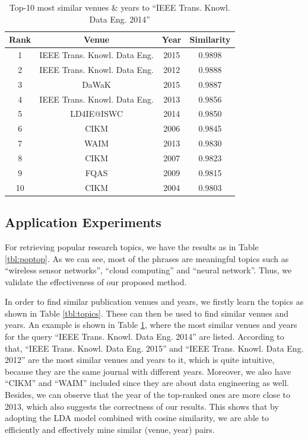 \documentclass{sig-alternate-05-2015}
\begin{document}
\begin{table}
\centering
\caption{Top-10 most similar venues \& years to ``IEEE Trans. Knowl. Data Eng. 2014''} \label{tbl:simvy}
\begin{tabular}{cccc} \hline
Rank & Venue & Year & Similarity\\ 
\hline
1 & IEEE Trans. Knowl. Data Eng. & 2015 & 0.9898 \\ 
2 & IEEE Trans. Knowl. Data Eng. & 2012 & 0.9888 \\
3 & DaWaK & 2015 & 0.9887 \\ 
4 & IEEE Trans. Knowl. Data Eng. & 2013 & 0.9856 \\
5 & LD4IE@ISWC & 2014 & 0.9850 \\
6 & CIKM & 2006 & 0.9845 \\
7 & WAIM & 2013 & 0.9830 \\
8 & CIKM & 2007 & 0.9823 \\
9 & FQAS & 2009 & 0.9815 \\
10 & CIKM & 2004 & 0.9803 \\
\hline
\end{tabular}
\end{table}

\subsection{Application Experiments}
For retrieving popular research topics, we have the results as in Table \ref{tbl:poptop}. As we can see, most of the phrases are meaningful topics such as ``wireless sensor networks'', ``cloud computing'' and ``neural network''. Thus, we validate the effectiveness of our proposed method.

In order to find similar publication venues and years, we firstly learn the topics as shown in Table \ref{tbl:topics}. These can then be used to find similar venues and years. An example is shown in Table \ref{tbl:simvy}, where the most similar venues and years for the query ``IEEE Trans. Knowl. Data Eng. 2014'' are listed. According to that, ``IEEE Trans. Knowl. Data Eng. 2015'' and ``IEEE Trans. Knowl. Data Eng. 2012'' are the most similar venues and years to it, which is quite intuitive, because they are the same journal with different years. Moreover, we also have ``CIKM'' and ``WAIM'' included since they are about data engineering as well. Besides, we can observe that the year of the top-ranked ones are more close to 2013, which also suggests the correctness of our results. This shows that by adopting the LDA model combined with cosine similarity, we are able to efficiently and effectively mine similar (venue, year) pairs.
\end{document}
